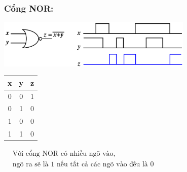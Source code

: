 \subsubsection{Cổng NOR:}
\begin{center}
    \includegraphics[width = 0.7\textwidth]{./local/image/24.png}
\end{center}
\begin{table}[h!]
    \centering
    \begin{tabular}{|cc|c|}
    \hline
    \textbf{x} & \textbf{y} & \textbf{z} \\ \hline
    0          & 0          & 1                      \\ 
    0          & 1          & 0                      \\ 
    1          & 0          & 0                      \\ 
    1          & 1          & 0                      \\ \hline
    \end{tabular} \qquad 
    $\begin{aligned}
        &\text{Với cổng NOR có nhiều ngõ vào,}\\
        &\text{ngõ ra sẽ là 1 nếu tất cả các ngõ vào đều là 0}
    \end{aligned}$
\end{table}
